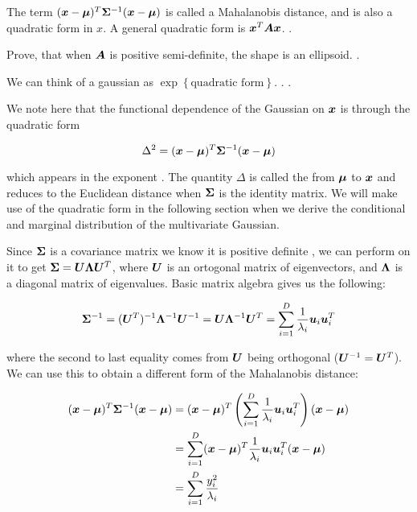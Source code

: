 \begin{tcolorbox}
    The term $({\bm{x}} - {\bm{\mu}})^T {\bm{\Sigma}}^{-1}({\bm{x}} - {\bm{\mu}})$ is called a Mahalanobis distance, and is also a quadratic form in $x$. A general quadratic form is ${\bm{x}}^T {\bm{A}} {\bm{x}}$. .
    
    Prove, that when ${\bm{A}}$ is positive semi-definite, the shape is an ellipsoid. .
    
    We can think of a gaussian as $\exp{\left\{ \text{quadratic form} \right\} }$. . .
\end{tcolorbox}

We note here that the functional dependence of the Gaussian on ${\bm{x}}$ is through the quadratic form

\begin{equation}
\Delta^2 = ({\bm{x}} - {\bm{\mu}})^T {\bm{\Sigma}}^{-1} ({\bm{x}} - {\bm{\mu}})
\end{equation}

which appears in the exponent \citep{bishop2016pattern} . The quantity $\Delta$ is called the  from ${\bm{\mu}}$ to ${\bm{x}}$ and reduces to the Euclidean distance when ${\bm{\Sigma}}$ is the identity matrix. We will make use of the quadratic form in the following section when we derive the conditional and marginal distribution of the multivariate Gaussian.

Since ${\bm{\Sigma}}$ is a covariance matrix we know it is positive definite , we can perform  on it to get ${\bm{\Sigma}} = {\bm{U}} {\bm{\Lambda}} {\bm{U}}^T$, where ${\bm{U}}$ is an ortogonal matrix of eigenvectors, and ${\bm{\Lambda}}$ is a diagonal matrix of eigenvalues. Basic matrix algebra gives us the following:

\begin{equation}
{\bm{\Sigma}}^{-1} = ({\bm{U}}^T)^{-1} {\bm{\Lambda}}^{-1} {\bm{U}}^{-1} = {\bm{U}} {\bm{\Lambda}}^{-1} {\bm{U}}^T = \sum_{i = 1}^D \frac{1}{\lambda_i} {\bm{u}}_i {\bm{u}}_i^T
\end{equation}

where the second to last equality comes from ${\bm{U}}$ being orthogonal (${\bm{U}}^{-1} = {\bm{U}}^T$). We can use this to obtain a different form of the Mahalanobis distance: 

\begin{align}
({\bm{x}} - {\bm{\mu}})^T {\bm{\Sigma}}^{-1} ({\bm{x}} - {\bm{\mu}}) &= ({\bm{x}} - {\bm{\mu}})^T \left( \sum_{i = 1}^D \frac{1}{\lambda_i} {\bm{u}}_i {\bm{u}}_i^T \right) ({\bm{x}} - {\bm{\mu}}) \\
&= \sum_{i = 1}^D ({\bm{x}} - {\bm{\mu}})^T \frac{1}{\lambda_i} {\bm{u}}_i {\bm{u}}_i^T ({\bm{x}} - {\bm{\mu}}) \\
&= \sum_{i = 1}^D \frac{y_i^2}{\lambda_i} \label{eq:mvn-ellipse}
\end{align}

